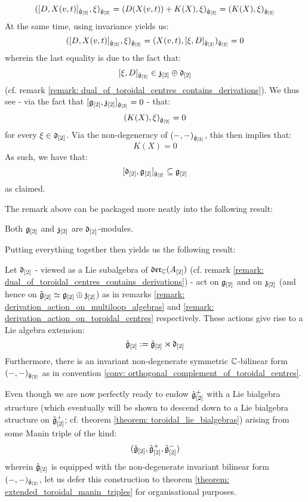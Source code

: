 \begin{remark}
                $$( [ D, X(v, t) ]_{\hat{\mathfrak{g}}_{[2]}}, \xi )_{\hat{\mathfrak{g}}_{[2]}} = (D( X(v, t) ) + K(X), \xi)_{\hat{\mathfrak{g}}_{[2]}} = (K(X), \xi)_{\hat{\mathfrak{g}}_{[2]}}$$
            At the same time, using invariance yields us:
                $$( [ D, X(v, t) ]_{\hat{\mathfrak{g}}_{[2]}}, \xi )_{\hat{\mathfrak{g}}_{[2]}} = (X(v, t), [\xi, D]_{\hat{\mathfrak{g}}_{[2]}})_{\hat{\mathfrak{g}}_{[2]}} = 0$$
            wherein the last equality is due to the fact that:
                $$[\xi, D]_{\hat{\mathfrak{g}}_{[2]}} \in \mathfrak{z}_{[2]} \oplus \mathfrak{d}_{[2]}$$
            (cf. remark \ref{remark: dual_of_toroidal_centres_contains_derivations}). We thus see - via the fact that $[\mathfrak{g}_{[2]}, \mathfrak{z}_{[2]}]_{\hat{\mathfrak{g}}_{[2]}} = 0$ - that:
                $$(K(X), \xi)_{\hat{\mathfrak{g}}_{[2]}} = 0$$
            for every $\xi \in \mathfrak{d}_{[2]}$. Via the non-degeneracy of $(-, -)_{\hat{\mathfrak{g}}_{[2]}}$, this then implies that:
                $$K(X) = 0$$
            As such, we have that:
                $$[ \mathfrak{d}_{[2]}, \mathfrak{g}_{[2]} ]_{\hat{\mathfrak{g}}_{[2]}} \subseteq \mathfrak{g}_{[2]}$$
            as claimed. 
        \end{remark}
        The remark above can be packaged more neatly into the following result:
        \begin{proposition} \label{prop: toroidal_lie_algebras_as_modules_over_div_0_vector_field_lie_algebras}
            Both $\mathfrak{g}_{[2]}$ and $\mathfrak{z}_{[2]}$ are $\mathfrak{d}_{[2]}$-modules. 
        \end{proposition}
        
        Putting everything together then yields us the following result:
        \begin{theorem} \label{theorem: extended_toroidal_lie_algebras}
            Let $\mathfrak{d}_{[2]}$ - viewed as a Lie subalgebra of $\mathfrak{der}_{\mathbb{C}}(A_{[2]})$ (cf. remark \ref{remark: dual_of_toroidal_centres_contains_derivations}) - act on $\mathfrak{g}_{[2]}$ and on $\mathfrak{z}_{[2]}$ (and hence on $\tilde{\mathfrak{g}}_{[2]}\simeq \mathfrak{g}_{[2]} \oplus \mathfrak{z}_{[2]}$) as in remarks \ref{remark: derivation_action_on_multiloop_algebras} and \ref{remark: derivation_action_on_toroidal_centres} respectively. These actions give rise to a Lie algebra extension:
                $$\hat{\mathfrak{g}}_{[2]} := \tilde{\mathfrak{g}}_{[2]}\rtimes \mathfrak{d}_{[2]}$$
            Furthermore, there is an invariant non-degenerate symmetric $\mathbb{C}$-bilinear form $(-, -)_{\hat{\mathfrak{g}}_{[2]}}$ as in convention \ref{conv: orthogonal_complement_of_toroidal_centres}. 
        \end{theorem}

        Even though we are now perfectly ready to endow $\hat{\mathfrak{g}}_{[2]}^+$ with a Lie bialgebra structure (which eventually will be shown to descend down to a Lie bialgebra structure on $\tilde{\mathfrak{g}}_{[2]}^+$; cf. theorem \ref{theorem: toroidal_lie_bialgebras}) arising from some Manin triple of the kind:
            $$(\hat{\mathfrak{g}}_{[2]}, \hat{\mathfrak{g}}_{[2]}^+, \hat{\mathfrak{g}}_{[2]}^-)$$
        wherein $\hat{\mathfrak{g}}_{[2]}$ is equipped with the non-degenerate invariant bilinear form $(-, -)_{\hat{\mathfrak{g}}_{[2]}}$, let us defer this construction to theorem \ref{theorem: extended_toroidal_manin_triples} for organisational purposes.